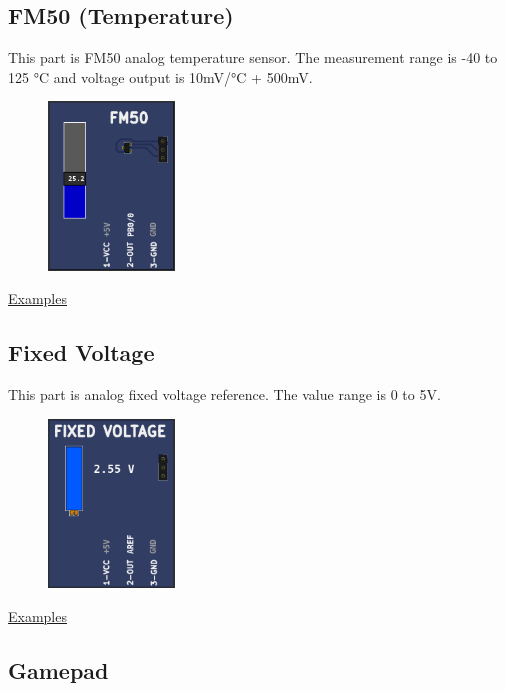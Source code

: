 \subsection{FM50 (Temperature)}

This part is FM50 analog temperature sensor. The measurement range is -40 to 125 °C  and 
voltage output is 10mV/°C + 500mV.

\begin{figure}[H]
\center
\includegraphics[width=0.3\textwidth]{img/part_fm50.png} 
\end{figure} 


\href{https://lcgamboa.github.io/picsimlab_examples/parts_FM50_(Temperature).html}{Examples}

\subsection{Fixed Voltage}

This part is analog fixed voltage reference. The value range is 0 to 5V.

\begin{figure}[H]
\center
\includegraphics[width=0.3\textwidth]{img/part_fixedv.png} 
\end{figure} 


\href{https://lcgamboa.github.io/picsimlab_examples/parts_Fixed_Voltage.html}{Examples}

 
\subsection{Gamepad}

